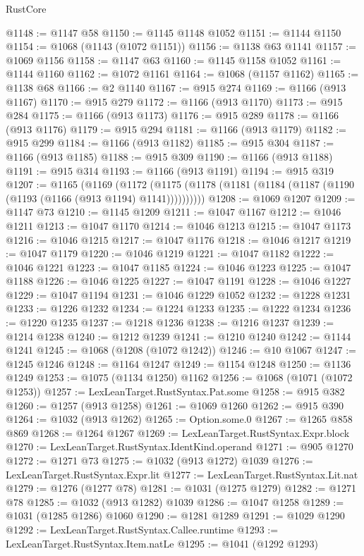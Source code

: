 \begin{lexlean}{RustCore}
\begin{coremodule}
@1148 := @1147 @58
@1150 := @1145 @1148 @1052
@1151 := @1144 @1150
@1154 := @1068 (@1143 (@1072 @1151))
@1156 := @1138 @63 @1141
@1157 := @1069 @1156
@1158 := @1147 @63
@1160 := @1145 @1158 @1052
@1161 := @1144 @1160
@1162 := @1072 @1161
@1164 := @1068 (@1157 @1162)
@1165 := @1138 @68
@1166 := @2 @1140
@1167 := @915 @274
@1169 := @1166 (@913 @1167)
@1170 := @915 @279
@1172 := @1166 (@913 @1170)
@1173 := @915 @284
@1175 := @1166 (@913 @1173)
@1176 := @915 @289
@1178 := @1166 (@913 @1176)
@1179 := @915 @294
@1181 := @1166 (@913 @1179)
@1182 := @915 @299
@1184 := @1166 (@913 @1182)
@1185 := @915 @304
@1187 := @1166 (@913 @1185)
@1188 := @915 @309
@1190 := @1166 (@913 @1188)
@1191 := @915 @314
@1193 := @1166 (@913 @1191)
@1194 := @915 @319
@1207 := @1165
    (@1169
      (@1172 (@1175 (@1178 (@1181 (@1184 (@1187 (@1190 (@1193 (@1166 (@913 @1194) @1141))))))))))
@1208 := @1069 @1207
@1209 := @1147 @73
@1210 := @1145 @1209
@1211 := @1047 @1167
@1212 := @1046 @1211
@1213 := @1047 @1170
@1214 := @1046 @1213
@1215 := @1047 @1173
@1216 := @1046 @1215
@1217 := @1047 @1176
@1218 := @1046 @1217
@1219 := @1047 @1179
@1220 := @1046 @1219
@1221 := @1047 @1182
@1222 := @1046 @1221
@1223 := @1047 @1185
@1224 := @1046 @1223
@1225 := @1047 @1188
@1226 := @1046 @1225
@1227 := @1047 @1191
@1228 := @1046 @1227
@1229 := @1047 @1194
@1231 := @1046 @1229 @1052
@1232 := @1228 @1231
@1233 := @1226 @1232
@1234 := @1224 @1233
@1235 := @1222 @1234
@1236 := @1220 @1235
@1237 := @1218 @1236
@1238 := @1216 @1237
@1239 := @1214 @1238
@1240 := @1212 @1239
@1241 := @1210 @1240
@1242 := @1144 @1241
@1245 := @1068 (@1208 (@1072 @1242))
@1246 := @10 @1067
@1247 := @1245 @1246
@1248 := @1164 @1247
@1249 := @1154 @1248
@1250 := @1136 @1249
@1253 := @1075 (@1134 @1250) @1162
@1256 := @1068 (@1071 (@1072 @1253))
@1257 := LexLeanTarget.RustSyntax.Pat.some
@1258 := @915 @382
@1260 := @1257 (@913 @1258)
@1261 := @1069 @1260
@1262 := @915 @390
@1264 := @1032 (@913 @1262)
@1265 := Option.some.{0}
@1267 := @1265 @858 @869
@1268 := @1264 @1267
@1269 := LexLeanTarget.RustSyntax.Expr.block
@1270 := LexLeanTarget.RustSyntax.IdentKind.operand
@1271 := @905 @1270
@1272 := @1271 @73
@1275 := @1032 (@913 @1272) @1039
@1276 := LexLeanTarget.RustSyntax.Expr.lit
@1277 := LexLeanTarget.RustSyntax.Lit.nat
@1279 := @1276 (@1277 @78)
@1281 := @1031 (@1275 @1279)
@1282 := @1271 @78
@1285 := @1032 (@913 @1282) @1039
@1286 := @1047 @1258
@1289 := @1031 (@1285 @1286) @1060
@1290 := @1281 @1289
@1291 := @1029 @1290
@1292 := LexLeanTarget.RustSyntax.Callee.runtime
@1293 := LexLeanTarget.RustSyntax.Item.natLe
@1295 := @1041 (@1292 @1293)

\end{coremodule}
\end{lexlean}
